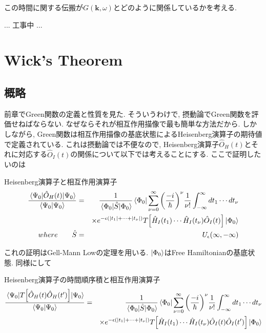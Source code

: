 \documentclass[10.5pt,a4paper]{jreport}
\newcommand{\bk}{\bm{k}}
\begin{document}
この時間に関する伝搬が$G(\bk, \omega)$とどのように関係しているかを考える.

... 工事中 ...

\section{Wick's Theorem}
\subsection{概略}
前章でGreen関数の定義と性質を見た. そういうわけで, 摂動論でGreen関数を評価せねばならない. なぜならそれが相互作用描像で最も簡単な方法だから. しかしながら, Green関数は相互作用描像の基底状態によるHeisenberg演算子の期待値で定義されている. これは摂動論では不便なので, Heisenberg演算子$\hat{O}_H(t)$とそれに対応する$\hat{O}_I(t)$の関係について以下では考えることにする. ここで証明したいのは
\begin{itembox}[c]{Heisenberg演算子と相互作用演算子}
  \begin{eqnarray}
\nonumber    \frac{\ev{\hat{O}_H(t)}{\Psi_0}}{\bra{\Psi_0}\ket{\Psi_0}} &=& \frac{1}{\ev{\hat{S}}{\Phi_0}}\bra{\Phi_0}\sum_{\nu = 0}^\infty \qty(\frac{-i}{\hbar})^\nu \frac{1}{\nu !}\int_{-\infty}^\infty dt_1\cdots dt_\nu\\
&&\times e^{-\epsilon(|t_1| + \cdots + |t_\nu|)} T\qty[\hat{H}_I(t_1)\cdots\hat{H}_I(t_\nu)\hat{O}_I(t)]\ket{\Phi_0}\\
\nonumber where\hspace{0.7cm}  \hat{S} &=& U_\epsilon(\infty, -\infty)\label{wick1}
  \end{eqnarray}
\end{itembox}

これの証明はGell-Mann Lowの定理を用いる. $\ket{\Phi_0}$はFree Hamiltonianの基底状態. 同様にして
\begin{itembox}[c]{Heisenberg演算子の時間順序積と相互作用演算子}
  \begin{eqnarray}
\nonumber    \frac{\ev{T\qty[\hat{O}_H(t)\hat{O}_H(t')]}{\Psi_0}}{\bra{\Psi_0}\ket{\Psi_0}} &=& \frac{1}{\ev{\hat{S}}{\Phi_0}}\bra{\Phi_0}\sum_{\nu = 0}^\infty \qty(\frac{-i}{\hbar})^\nu \frac{1}{\nu !}\int_{-\infty}^\infty dt_1\cdots dt_\nu\\
&&\times e^{-\epsilon(|t_1| + \cdots + |t_\nu|)} T\qty[\hat{H}_I(t_1)\cdots\hat{H}_I(t_\nu)\hat{O}_I(t)\hat{O}_I(t')]\ket{\Phi_0}\label{wick2}
  \end{eqnarray}
\end{itembox}
\end{document}

